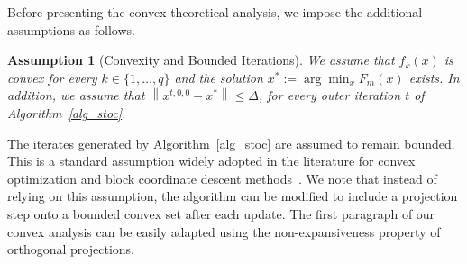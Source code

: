 \documentclass[11pt,a4paper]{article}
\numberwithin{equation}{section}%
\newtheorem{remark}{Remark}[section]
\newtheorem{assumption}{Assumption}[section]
\renewcommand{\(}{\left (}
\renewcommand{\)}{\right )}
\newcommand{\diam}{\Delta}
\newcommand{\Fm}{F_m}
\begin{document}
Before presenting the convex theoretical analysis, we impose the additional assumptions as follows. 
\begin{assumption}[Convexity and Bounded Iterations]\label{assump:convex}
We assume that $f_k(x)$ is convex for every $k \in \{ 1, \dots, q\}$ and the solution 
$x^* := \arg\min_x \Fm (x)$ exists. 
In addition, we assume that 
$\left\|x^{t,0,0}- x^* \right\| \leq \diam$, for every outer iteration $t$ of Algorithm~\ref{alg_stoc}. 
\end{assumption}


The iterates generated by Algorithm~\ref{alg_stoc} are assumed to remain bounded. This is a standard assumption widely adopted in the literature for convex optimization and block coordinate descent methods~\cite{Nesterov2012EfficiencyOC,ABeck_LTetruashvili_2013,xu2015blockstochasticgradientiteration,SLiu_LNVicente_2019}. We note that instead of relying on this assumption, the algorithm can be modified to include a projection step onto a bounded convex set after each update. 
The first paragraph of our convex analysis can be easily adapted using the non-expansiveness property of orthogonal projections.
\end{document}
